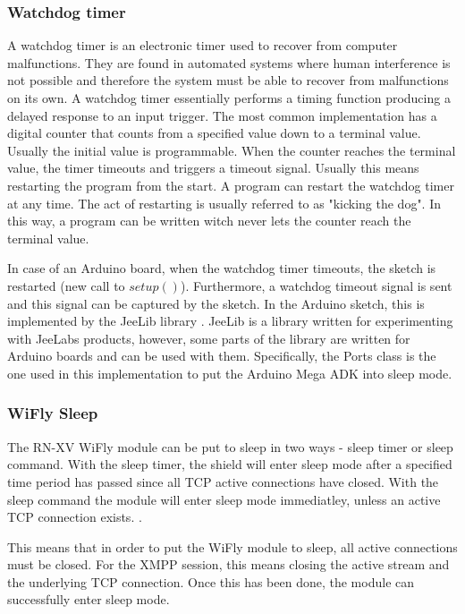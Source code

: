 \subsubsection{Watchdog timer}
A watchdog timer \cite{watchdog_timer} is an electronic timer used to recover from computer malfunctions. They are found in automated systems where human interference is not possible and therefore the system must be able to recover from malfunctions on its own. 
A watchdog timer essentially performs a timing function producing a delayed response to an input trigger. The most common implementation has a digital counter that counts from a specified value down to a terminal value. Usually the initial value is programmable. When the counter reaches the terminal value, the timer timeouts and triggers a timeout signal. Usually this means restarting the program from the start. A program can restart the watchdog timer at any time. The act of restarting is usually referred to as "kicking the dog". In this way, a program can be written witch never lets the counter reach the terminal value.

In case of an Arduino board, when the watchdog timer timeouts, the sketch is restarted (new call to $setup()$). Furthermore, a watchdog timeout signal is sent and this signal can be captured by the sketch. In the Arduino sketch, this is implemented by the JeeLib library \cite{jeelib_general}. JeeLib is a library written for experimenting with JeeLabs products, however, some parts of the library are written for Arduino boards and can be used with them. Specifically, the Ports class \cite{jeelib_port} is the one used in this implementation to put the Arduino Mega ADK into sleep mode. 

\subsubsection{WiFly Sleep}

The RN-XV WiFly module can be put to sleep in two ways - sleep timer or sleep command. With the sleep timer, the shield will enter sleep mode after a specified time period has passed since all TCP active connections have closed. With the sleep command the module will enter sleep mode immediatley, unless an active TCP connection exists. \cite{wifly_manual}. 

This means that in order to put the WiFly module to sleep, all active connections must be closed. For the XMPP session, this means closing the active stream and the underlying TCP connection. Once this has been done, the module can successfully enter sleep mode. 


